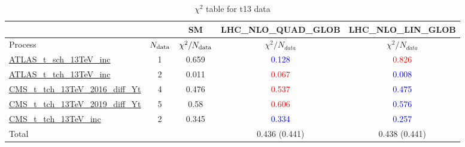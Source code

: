\documentclass{article}
\begin{document}
\begin{table}[H]
\centering
\begin{tabular}{|l|c|c|c|c|}
\hline
 \multicolumn{2}{|c|}{} & SM& LHC_NLO_QUAD_GLOB& LHC_NLO_LIN_GLOB\\ \hline
Process & $N_{\rm data}$ & $\chi^ 2/N_{\rm data}$& $\chi^ 2/N_{data}$& $\chi^ 2/N_{data}$\\ \hline
\href{https://arxiv.org}{ATLAS_t_sch_13TeV_inc} & 1 & 0.659 & \textcolor{blue}                            {0.128} & \textcolor{red}                            {0.826} \\ \hline
\href{https://arxiv.org}{ATLAS_t_tch_13TeV_inc} & 2 & 0.011 & \textcolor{red}                            {0.067} & \textcolor{blue}                            {0.008} \\ \hline
\href{https://arxiv.org}{CMS_t_tch_13TeV_2016_diff_Yt} & 4 & 0.476 & \textcolor{red}                            {0.537} & \textcolor{blue}                            {0.475} \\ \hline
\href{https://arxiv.org}{CMS_t_tch_13TeV_2019_diff_Yt} & 5 & 0.58 & \textcolor{red}                            {0.606} & \textcolor{blue}                            {0.576} \\ \hline
\href{https://arxiv.org}{CMS_t_tch_13TeV_inc} & 2 & 0.345 & \textcolor{blue}                            {0.334} & \textcolor{blue}                            {0.257} \\ \hline
\hline Total & &  & 0.436 (0.441) & 0.438 (0.441) \\ \hline
\end{tabular}
\caption{$\chi^2$ table for t13 data}
\end{table}
\end{document}
